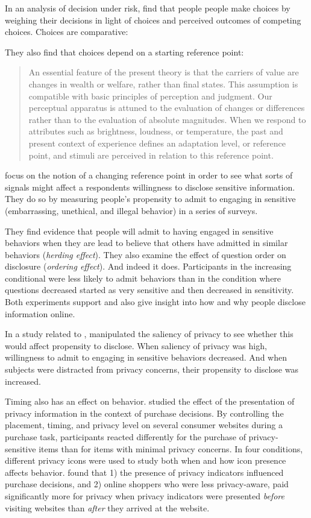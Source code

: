 In an analysis of decision under risk,  \cite{Tversky:1981vc}  find that people people make choices by weighing their decisions in light of choices and perceived outcomes of competing choices. Choices are comparative:

They also find that choices depend on a starting reference point:
\begin{quote}
An essential feature of the present theory is that the carriers of value are 
changes in wealth or welfare, rather than final states. This assumption is compatible with basic principles of perception and judgment. Our perceptual apparatus is attuned to the evaluation of changes or differences rather than to the evaluation of absolute magnitudes. When we respond to attributes such as brightness, loudness, or temperature, the past and present context of experience defines an adaptation level, or reference point, and stimuli are perceived in relation to this reference point. \citep[p. 277]{Kahneman:1979wl}
\end{quote}

 \cite{Acquisti:2012tp}  focus on the notion of a changing reference point in order to see what sorts of signals might affect a respondents willingness to disclose sensitive information. They do so by measuring people's propensity to admit to engaging in sensitive (embarrassing, unethical, and illegal behavior) in a series of surveys.

They find evidence that people will admit to having engaged in sensitive behaviors when they are lead to believe that others have admitted in similar behaviors (\emph{herding effect}). They also examine the effect of question order on disclosure (\emph{ordering effect}). And indeed it does. Participants in the increasing conditional were less likely to admit behaviors than in the condition where questions decreased started as very sensitive and then decreased in sensitivity. Both experiments support  \cite{Kahneman:1979wl}  and also give insight into how and why people disclose information online.

In a study related to  \cite{Acquisti:2012tp}, \cite{John:2009wg}  manipulated the saliency of privacy to see whether this would affect propensity to disclose. When saliency of privacy was high, willingness to admit to engaging in sensitive behaviors decreased. And when subjects were distracted from privacy concerns, their propensity to disclose was increased.

Timing also has an effect on behavior.  \citet*{Egelman:2009ut}  studied the effect of the presentation of privacy information in the context of purchase decisions. By controlling the placement, timing, and privacy level on several consumer websites during a purchase task, participants reacted differently for the purchase of privacy-sensitive items than for items with minimal privacy concerns. In four conditions, different privacy icons were used to study both when and how icon presence affects behavior.  \citet{Egelman:2009ut}  found that 1) the presence of privacy indicators influenced purchase decisions, and 2) online shoppers who were less privacy-aware, paid significantly more for privacy when privacy indicators were presented \emph{before} visiting websites than \emph{after} they arrived at the website.

